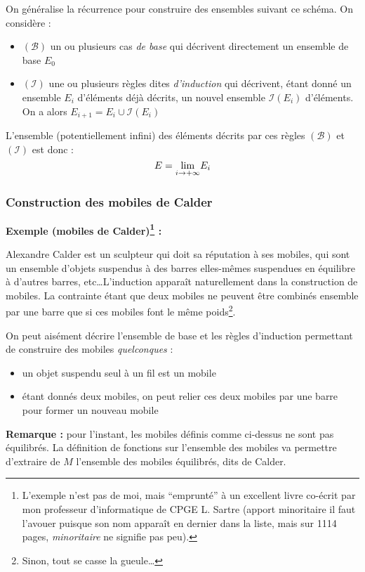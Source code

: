 \documentclass[../../main.tex]{subfiles}
\begin{document}
On généralise la récurrence pour construire des ensembles suivant ce schéma. On considère :
\begin{itemize}
	\item $(\mathcal{B})$ un ou plusieurs cas \textit{de base} qui décrivent directement un ensemble de base $E_0$
	\item $(\mathcal{I})$ une ou plusieurs règles dites \textit{d'induction} qui décrivent, étant donné un ensemble $E_i$ d'éléments déjà décrits, un nouvel ensemble $\mathcal{I}(E_{i})$ d'éléments. On a alors $E_{i+1} = E_{i}\cup \mathcal{I}(E_i)$
\end{itemize}
L'ensemble (potentiellement infini) des éléments décrits par ces règles $(\mathcal{B})$ et $(\mathcal{I})$ est donc :
$$E = \underset{i\rightarrow +\infty}{\rm{lim}}E_i$$
\subsubsection{Construction des mobiles de Calder}
\textbf{Exemple (mobiles de Calder)\footnote{L'exemple n'est pas de moi, mais ``emprunté'' à un excellent livre \cite{CPGESartre} co-écrit  par mon professeur d'informatique de CPGE L. Sartre (apport minoritaire il faut l'avouer puisque son nom apparaît en dernier dans la liste, mais sur 1114 pages, \textit{minoritaire} ne signifie pas peu).} :}

Alexandre Calder est un sculpteur qui doit sa réputation à ses mobiles, qui sont un ensemble d'objets suspendus à des barres elles-mêmes suspendues en équilibre à d'autres barres, etc\dots L'induction apparaît naturellement dans la construction de mobiles. La contrainte étant que deux mobiles ne peuvent être combinés ensemble par une barre que si ces mobiles font le même poids\footnote{Sinon, tout se casse la gueule\dots}.

\begin{center}

\end{center}

On peut aisément décrire l'ensemble de base et les règles d'induction permettant de construire des mobiles \textit{quelconques} :
\begin{itemize}
	\item un objet suspendu seul à un fil est un mobile
	\item étant donnés deux mobiles, on peut relier ces deux mobiles par une barre pour former un nouveau mobile
\end{itemize}
\textbf{Remarque :} pour l'instant, les mobiles définis comme ci-dessus ne sont pas équilibrés. La définition de fonctions sur l'ensemble des mobiles va permettre d'extraire de $M$ l'ensemble des mobiles équilibrés, dits de Calder.
\end{document}
